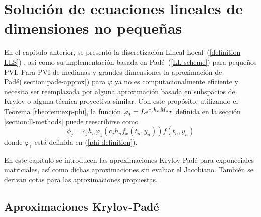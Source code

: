 \chapter{Solución de ecuaciones lineales de dimensiones no pequeñas}\label{chapter:solve-non-smal-lineal-eq}

En el capítulo anterior, se presentó la discretización Lineal Local~(\ref{definition LLS}) , así como su implementación basada en Padé~(\ref{LL-scheme}) para pequeños PVI. Para PVI de medianas y grandes dimensiones la aproximación de Padé(\ref{section:pade-approx}) para $\varphi$ ya no es computacionalmente eficiente y necesita ser reemplazada por alguna aproximación basada en subspacios de Krylov o alguna técnica proyectiva similar. Con este propósito, utilizando el Teorema \ref{theorem:exp-phi}, la función $\varphi_j=L\mathrm{e}^{c_jh_nM_n}r$ definida en la sección \ref{section:ll-methods} puede reescribirse como
\begin{equation*}
    \phi_j=c_jh_n\varphi_1(c_jh_nf_x(t_n,y_n))f(t_n,y_n)
\end{equation*}
donde $\varphi_1$ está definida en (\ref{phi-definition}).

En este capítulo se introducen las aproximaciones Krylov-Padé para exponeciales matriciales, así como dichas aproximaciones sin evaluar el Jacobiano. También se derivan cotas para las aproximaciones propuestas.

\section{Aproximaciones Krylov-Padé}

